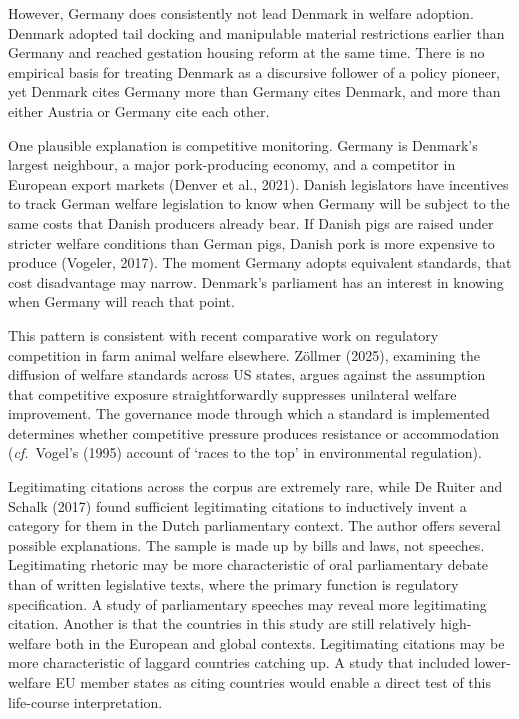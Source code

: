 \documentclass[twocolumn, 10pt, a4paper]{article}
\begin{document}
However, Germany does consistently not lead Denmark in welfare adoption. Denmark
adopted tail docking and manipulable material restrictions earlier than Germany and
reached gestation housing reform at the same time. There is no empirical basis for
treating Denmark as a discursive follower of a policy pioneer, yet Denmark cites
Germany more than Germany cites Denmark, and more than either Austria or Germany cite
each other.

One plausible explanation is competitive monitoring. Germany is Denmark's largest
neighbour, a major pork-producing economy, and a competitor in European export
markets (Denver et al., 2021). Danish legislators have incentives to track German
welfare legislation to know when Germany will be subject to the same costs that
Danish producers already bear. If Danish pigs are raised under stricter welfare
conditions than German pigs, Danish pork is more expensive to produce (Vogeler,
2017). The moment Germany adopts equivalent standards, that cost disadvantage may
narrow. Denmark's parliament has an interest in knowing when Germany will reach that
point.

This pattern is consistent with recent comparative work on regulatory competition in
farm animal welfare elsewhere. Z\"{o}llmer (2025), examining the diffusion of welfare
standards across US states, argues against the assumption that competitive exposure
straightforwardly suppresses unilateral welfare improvement. The governance mode
through which a standard is implemented determines whether competitive pressure
produces resistance or accommodation (\textit{cf.}~Vogel's (1995) account of `races
to the top' in environmental regulation).

Legitimating citations across the corpus are extremely rare, while De Ruiter and
Schalk (2017) found sufficient legitimating citations to inductively invent a
category for them in the Dutch parliamentary context. The author offers several
possible explanations. The sample is made up by bills and laws, not speeches.
Legitimating rhetoric may be more characteristic of oral parliamentary debate than of
written legislative texts, where the primary function is regulatory specification. A
study of parliamentary speeches may reveal more legitimating citation. Another is
that the countries in this study are still relatively high-welfare both in the
European and global contexts. Legitimating citations may be more characteristic of
laggard countries catching up. A study that included lower-welfare EU member states
as citing countries would enable a direct test of this life-course interpretation.
\end{document}
